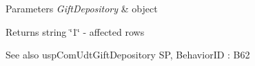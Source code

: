 \begin{DoxyParams}{Parameters}
{\em Gift\+Depository} & object \\
\hline
\end{DoxyParams}
\begin{DoxyReturn}{Returns}
string \char`\"{}1\char`\"{} -\/ affected rows 
\end{DoxyReturn}
\begin{DoxySeeAlso}{See also}
usp\+Com\+Udt\+Gift\+Depository SP, Behavior\+ID \+: B62 
\end{DoxySeeAlso}
